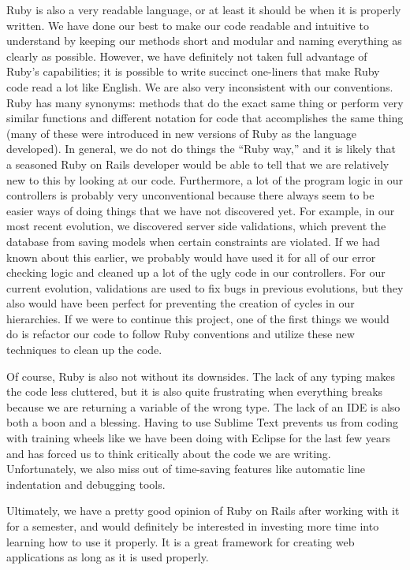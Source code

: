 \documentclass{article}
\begin{document}
Ruby is also a very readable language, or at least it should be when it is properly written.  We have done our best to make our code readable and intuitive to understand by keeping our methods short and modular and naming everything as clearly as possible.  However, we have definitely not taken full advantage of Ruby's capabilities; it is possible to write succinct one-liners that make Ruby code read a lot like English.  We are also very inconsistent with our conventions.  Ruby has many synonyms: methods that do the exact same thing or perform very similar functions and different notation for code that accomplishes the same thing (many of these were introduced in new versions of Ruby as the language developed).  In general, we do not do things the ``Ruby way,'' and it is likely that a seasoned Ruby on Rails developer would be able to tell that we are relatively new to this by looking at our code.  Furthermore, a lot of the program logic in our controllers is probably very unconventional because there always seem to be easier ways of doing things that we have not discovered yet.  For example, in our most recent evolution, we discovered server side validations, which prevent the database from saving models when certain constraints are violated.  If we had known about this earlier, we probably would have used it for all of our error checking logic and cleaned up a lot of the ugly code in our controllers.  For our current evolution, validations are used to fix bugs in previous evolutions, but they also would have been perfect for preventing the creation of cycles in our hierarchies.  If we were to continue this project, one of the first things we would do is refactor our code to follow Ruby conventions and utilize these new techniques to clean up the code.\par
Of course, Ruby is also not without its downsides.  The lack of any typing makes the code less cluttered, but it is also quite frustrating when everything breaks because we are returning a variable of the wrong type.  The lack of an IDE is also both a boon and a blessing.  Having to use Sublime Text prevents us from coding with training wheels like we have been doing with Eclipse for the last few years and has forced us to think critically about the code we are writing.  Unfortunately, we also miss out of time-saving features like automatic line indentation and debugging tools.\par
Ultimately, we have a pretty good opinion of Ruby on Rails after working with it for a semester, and would definitely be interested in investing more time into learning how to use it properly.  It is a great framework for creating web applications as long as it is used properly.
\end{document}

